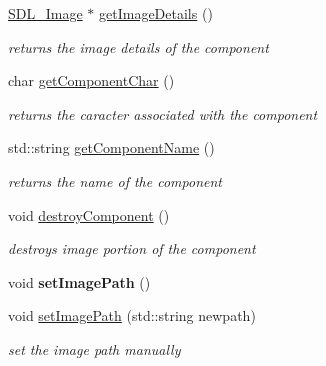\begin{DoxyCompactItemize}
\hypertarget{class_game_component_ac3ba1236d964b98b96ff5246ca759949}{}\label{class_game_component_ac3ba1236d964b98b96ff5246ca759949} 
\hyperlink{class_s_d_l___image}{S\+D\+L\+\_\+\+Image} $\ast$ \hyperlink{class_game_component_ac3ba1236d964b98b96ff5246ca759949}{get\+Image\+Details} ()
\begin{DoxyCompactList}\small\item\em returns the image details of the component \end{DoxyCompactList}\item 
\hypertarget{class_game_component_af35b353860f119e0729724129a9c5b7f}{}\label{class_game_component_af35b353860f119e0729724129a9c5b7f} 
char \hyperlink{class_game_component_af35b353860f119e0729724129a9c5b7f}{get\+Component\+Char} ()
\begin{DoxyCompactList}\small\item\em returns the caracter associated with the component \end{DoxyCompactList}\item 
\hypertarget{class_game_component_a272b091e7279497d6c14c5dfbd8cb989}{}\label{class_game_component_a272b091e7279497d6c14c5dfbd8cb989} 
std\+::string \hyperlink{class_game_component_a272b091e7279497d6c14c5dfbd8cb989}{get\+Component\+Name} ()
\begin{DoxyCompactList}\small\item\em returns the name of the component \end{DoxyCompactList}\item 
\hypertarget{class_game_component_af77731abc50adb4b200ddf5679984848}{}\label{class_game_component_af77731abc50adb4b200ddf5679984848} 
void \hyperlink{class_game_component_af77731abc50adb4b200ddf5679984848}{destroy\+Component} ()
\begin{DoxyCompactList}\small\item\em destroys image portion of the component \end{DoxyCompactList}\item 
\hypertarget{class_game_component_acc8e10db4dba562cdc58e2422b1ea1d9}{}\label{class_game_component_acc8e10db4dba562cdc58e2422b1ea1d9} 
void {\bfseries set\+Image\+Path} ()
\item 
\hypertarget{class_game_component_ad1196de733be3723db810f90d93ed09a}{}\label{class_game_component_ad1196de733be3723db810f90d93ed09a} 
void \hyperlink{class_game_component_ad1196de733be3723db810f90d93ed09a}{set\+Image\+Path} (std\+::string newpath)
\begin{DoxyCompactList}\small\item\em set the image path manually \end{DoxyCompactList}\item 

\end{DoxyCompactItemize}
